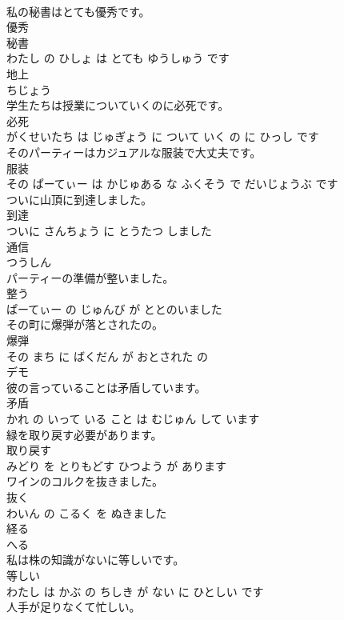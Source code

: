 \documentclass[8pt]{extreport}
\begin{document}
\begin{CJK}{UTF8}{min}
\\	私の秘書はとても優秀です。	
\\	優秀 
\\	秘書 
\\	わたし の ひしょ は とても ゆうしゅう です			
\\	地上	
\\	ちじょう			
\\	学生たちは授業についていくのに必死です。	
\\	必死 
\\	がくせいたち は じゅぎょう に ついて いく の に ひっし です			
\\	そのパーティーはカジュアルな服装で大丈夫です。	
\\	服装 
\\	その ぱーてぃー は かじゅある な ふくそう で だいじょうぶ です			
\\	ついに山頂に到達しました。	
\\	到達 
\\	ついに さんちょう に とうたつ しました			
\\	通信	
\\	つうしん			
\\	パーティーの準備が整いました。	
\\	整う 
\\	ぱーてぃー の じゅんび が ととのいました			
\\	その町に爆弾が落とされたの。	
\\	爆弾 
\\	その まち に ばくだん が おとされた の			
\\	デモ	
\\	彼の言っていることは矛盾しています。	
\\	矛盾 
\\	かれ の いって いる こと は むじゅん して います			
\\	緑を取り戻す必要があります。	
\\	取り戻す 
\\	みどり を とりもどす ひつよう が あります			
\\	ワインのコルクを抜きました。	
\\	抜く 
\\	わいん の こるく を ぬきました			
\\	経る	
\\	へる			
\\	私は株の知識がないに等しいです。	
\\	等しい 
\\	わたし は かぶ の ちしき が ない に ひとしい です			
\\	人手が足りなくて忙しい。	

\end{CJK}
\end{document}
